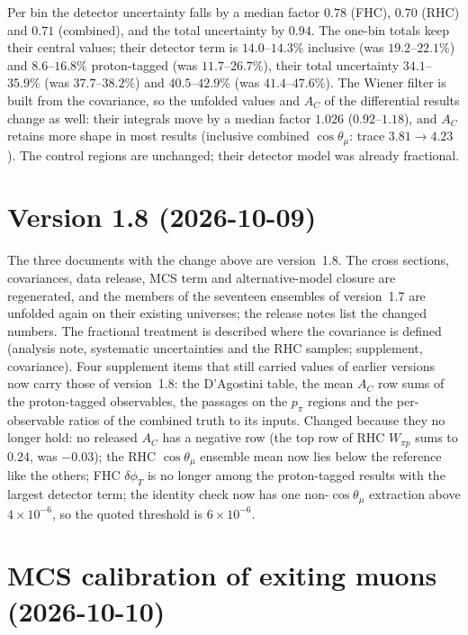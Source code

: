 Per bin the detector uncertainty falls by a median factor $0.78$ (FHC), $0.70$ (RHC) and $0.71$ (combined),
and the total uncertainty by $0.94$. The one-bin totals keep their central values; their detector term is
$14.0$--$14.3\%$ inclusive (was $19.2$--$22.1\%$) and $8.6$--$16.8\%$ proton-tagged (was $11.7$--$26.7\%$),
their total uncertainty $34.1$--$35.9\%$ (was $37.7$--$38.2\%$) and $40.5$--$42.9\%$ (was $41.4$--$47.6\%$).
The Wiener filter is built from the covariance, so the unfolded values and $A_C$ of the differential results
change as well: their integrals move by a median factor $1.026$ ($0.92$--$1.18$), and $A_C$ retains more
shape in most results (inclusive combined $\cos\theta_\mu$: trace $3.81\to4.23$). The control regions are
unchanged; their detector model was already fractional.

\section{Version 1.8 (2026-10-09)}

The three documents with the change above are version~1.8. The cross sections, covariances, data release,
MCS term and alternative-model closure are regenerated, and the members of the seventeen ensembles of
version~1.7 are unfolded again on their existing universes; the release notes list the changed numbers.
The fractional treatment is described where the covariance is defined (analysis note, systematic
uncertainties and the RHC samples; supplement, covariance). Four supplement items that still carried values
of earlier versions now carry those of version~1.8: the D'Agostini table, the mean $A_C$ row sums of the
proton-tagged observables, the passages on the $p_\pi$ regions and the per-observable ratios of the combined
truth to its inputs. Changed because they no longer hold: no released $A_C$ has a negative row (the top row of
RHC $W_{\pi p}$ sums to $0.24$, was $-0.03$); the RHC $\cos\theta_\mu$ ensemble mean now lies below the
reference like the others; FHC $\delta\phi_T$ is no longer among the proton-tagged results with the largest
detector term; the identity check now has one non-$\cos\theta_\mu$ extraction above $4\times10^{-6}$, so the
quoted threshold is $6\times10^{-6}$.

\section{MCS calibration of exiting muons (2026-10-10)}

